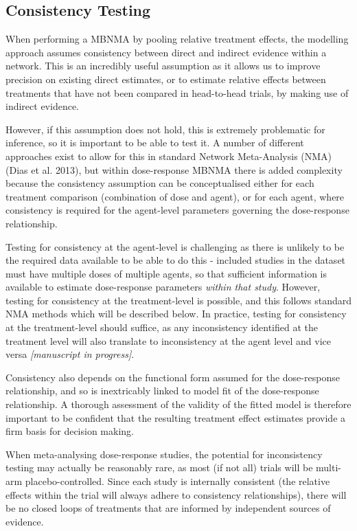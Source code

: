 \documentclass[]{article}
\begin{document}
\hypertarget{consistency-testing}{%
\subsection{Consistency Testing}\label{consistency-testing}}

When performing a MBNMA by pooling relative treatment effects, the
modelling approach assumes consistency between direct and indirect
evidence within a network. This is an incredibly useful assumption as it
allows us to improve precision on existing direct estimates, or to
estimate relative effects between treatments that have not been compared
in head-to-head trials, by making use of indirect evidence.

However, if this assumption does not hold, this is extremely problematic
for inference, so it is important to be able to test it. A number of
different approaches exist to allow for this in standard Network
Meta-Analysis (NMA) (Dias et al. 2013), but within dose-response MBNMA
there is added complexity because the consistency assumption can be
conceptualised either for each treatment comparison (combination of dose
and agent), or for each agent, where consistency is required for the
agent-level parameters governing the dose-response relationship.

Testing for consistency at the agent-level is challenging as there is
unlikely to be the required data available to be able to do this -
included studies in the dataset must have multiple doses of multiple
agents, so that sufficient information is available to estimate
dose-response parameters \emph{within that study}. However, testing for
consistency at the treatment-level is possible, and this follows
standard NMA methods which will be described below. In practice, testing
for consistency at the treatment-level should suffice, as any
inconsistency identified at the treatment level will also translate to
inconsistency at the agent level and vice versa \emph{{[}manuscript in
progress{]}}.

Consistency also depends on the functional form assumed for the
dose-response relationship, and so is inextricably linked to model fit
of the dose-response relationship. A thorough assessment of the validity
of the fitted model is therefore important to be confident that the
resulting treatment effect estimates provide a firm basis for decision
making.

When meta-analysing dose-response studies, the potential for
inconsistency testing may actually be reasonably rare, as most (if not
all) trials will be multi-arm placebo-controlled. Since each study is
internally consistent (the relative effects within the trial will always
adhere to consistency relationships), there will be no closed loops of
treatments that are informed by independent sources of evidence.
\end{document}
